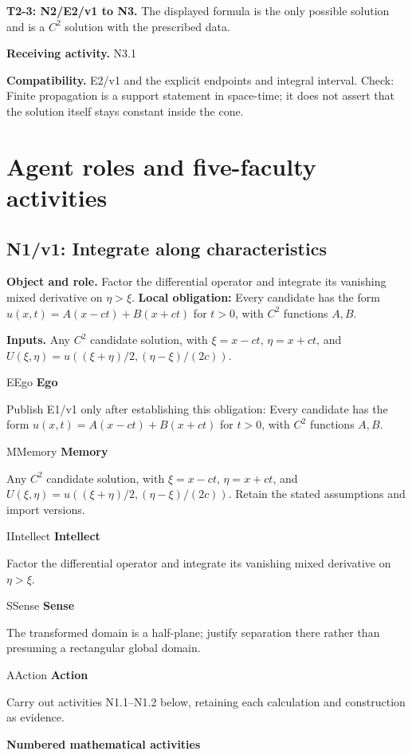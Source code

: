\documentclass[preprint,12pt,aps,pra,showkeys,amsmath,amssymb,superscriptaddress,floatfix]{revtex4-2}
\theoremstyle{definition}
\theoremstyle{remark}
\newcommand{\mmfaculty}[3]{%
 \begin{mmfacultybox}{#1}{#2}
 {\sffamily\bfseries\color{MMBlue}#2}\par\smallskip #3
 \end{mmfacultybox}}
\newcommand{\field}[2]{\par\smallskip\noindent\textbf{#1.} #2\par}
\begin{document}
\field{T2-3: N2/E2/v1 to N3}{The displayed formula is the only possible solution and is a \(C^2\)
solution with the prescribed data.}

\field{Receiving activity}{N3.1}

\field{Compatibility}{E2/v1 and the explicit endpoints and integral interval. Check: Finite
propagation is a support statement in space-time; it does not assert
that the solution itself stays constant inside the cone.}

\endgroup

\clearpage\section{Agent roles and five-faculty activities}\begingroup\small\linespread{1.05}\selectfont{}

\subsection{N1/v1: Integrate along characteristics}

\field{Object and role}{Factor the differential operator and integrate its vanishing mixed
derivative on \(\eta>\xi\). \textbf{Local obligation:} Every candidate
has the form \(u(x,t)=A(x-ct)+B(x+ct)\) for \(t>0\), with \(C^2\)
functions \(A,B\).}

\field{Inputs}{Any \(C^2\) candidate solution, with \(\xi=x-ct\), \(\eta=x+ct\), and
\(U(\xi,\eta)=u((\xi+\eta)/2,(\eta-\xi)/(2c))\).}

\mmfaculty{E}{Ego}{Publish E1/v1 only after establishing this obligation: Every candidate
has the form \(u(x,t)=A(x-ct)+B(x+ct)\) for \(t>0\), with \(C^2\)
functions \(A,B\).}

\mmfaculty{M}{Memory}{Any \(C^2\) candidate solution, with \(\xi=x-ct\), \(\eta=x+ct\), and
\(U(\xi,\eta)=u((\xi+\eta)/2,(\eta-\xi)/(2c))\). Retain the stated
assumptions and import versions.}

\mmfaculty{I}{Intellect}{Factor the differential operator and integrate its vanishing mixed
derivative on \(\eta>\xi\).}

\mmfaculty{S}{Sense}{The transformed domain is a half-plane; justify separation there rather
than presuming a rectangular global domain.}

\mmfaculty{A}{Action}{Carry out activities N1.1--N1.2 below, retaining each calculation and
construction as evidence.}

\smallskip\noindent\textbf{Numbered mathematical activities}
\end{document}
